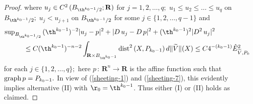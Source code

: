\documentclass[a4paper,11pt]{amsart}
\begin{document}
\begin{proof}
where $u_{j} \in C^{2} \,(B_{\th^{k_{0}-1}/2}; {\mathbf R})$ for $j=1, 2, \ldots, q;$ 
$u_{1} \leq u_{2} \leq \ldots \leq u_{q}$ on $B_{\th^{k_{0}-1}/2};$ $u_{j} < u_{j+1}$ on $B_{\th^{k_{0}-1}/2}$ for some $j \in \{1,2, \ldots, q-1\}$ and
\begin{eqnarray}\label{sheeting-8}
{\rm sup}_{B_{\th^{k_{0}-1}/2}} \, (\th^{k_{0}-1})^{-2}|u_{j} - p|^{2} + |D \, u_{j} - D \, p|^{2} + (\th^{k_{0}-1})^{2}|D^{2} \, u_{j}|^{2}&&\nonumber\\
&&\hspace{-4in} \leq 
C(\th^{k_{0}-1})^{-n-2}\int_{{\mathbf R} \times B_{\th^{k_{0}-1}}} {\rm dist}^{2} \, (X, P_{k_{0}-1}) \, d\|\widetilde{V}\|(X)
\leq C4^{-(k_{0}-1)}{\hat E}_{\widetilde{V}, P_{0}}^{2}
\end{eqnarray}
for each $j \in \{1,2, \ldots, q\};$  here $p \, : \, {\mathbf R}^{n} \to {\mathbf R}$ is the affine function such that ${\rm graph} \,  p = P_{k_{0}-1}.$ In view of (\ref{sheeting-1}) and (\ref{sheeting-7}), this evidently implies alternative (II) with $\r_{0} = \th^{k_{0}-1}$. Thus either (I) or (II) holds as claimed.


\end{proof}
\end{document}
